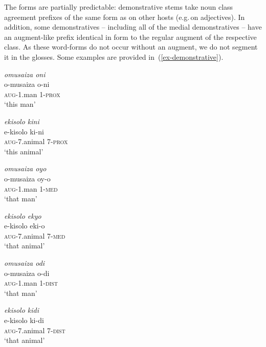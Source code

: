 The forms are partially predictable: demonstrative stems take noun class agreement prefixes of the same form as on other hosts (e.g.\,on adjectives). 
In addition, some demonstratives – including all of the medial demonstratives – have an augment-like prefix identical in form to the regular augment of the respective class. 
As these word-forms do not occur without an augment, we do not segment it in the glosses.
Some examples are provided in~(\ref{ex-demonstrative}). 

\ea \label{ex-demonstrative}
\begin{multicols}{2}
\begin{xlist}	

    \ex  \label{ex-demonstrative-a}
    \textit{omusaiza oni}\\
    \gll   o-musaiza o-ni\\
	\textsc{aug}-1.man 1-\textsc{prox}\\
    \glt  ‘this man’
    
    \ex  \label{ex-demonstrative-b}
    \textit{ekisolo kini}\\
    \gll     e-kisolo ki-ni\\
	\textsc{aug}-7.animal 7-\textsc{prox}\\
    \glt  `this animal’
    
\ex  \label{ex-demonstrative-c}
    \textit{omusaiza oyo}\\
    \gll     o-musaiza oy-o\\
	\textsc{aug}-1.man 1-\textsc{med}\\
    \glt  `that man’

\ex  \label{ex-demonstrative-d}
    \textit{ekisolo ekyo}\\
    \gll     e-kisolo eki-o\\
	\textsc{aug}-7.animal 7-\textsc{med}\\
    \glt  `that animal’
    
\ex  \label{ex-demonstrative-e}
    \textit{omusaiza odi}\\
    \gll     o-musaiza o-di\\
	\textsc{aug}-1.man 1-\textsc{dist}\\
    \glt  `that man’

\ex  \label{ex-demonstrative-f}
    \textit{ekisolo kidi}\\
    \gll     e-kisolo ki-di\\
	\textsc{aug}-7.animal 7-\textsc{dist}\\
    \glt  `that animal’
\end{xlist}	
\end{multicols}

